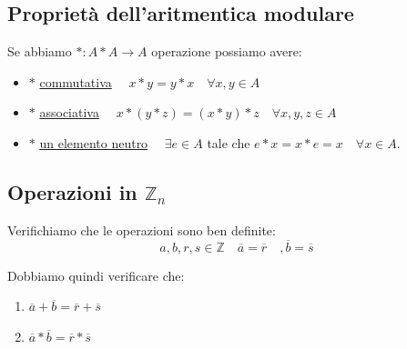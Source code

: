 \documentclass{article}
\begin{document}
\subsection{Proprietà dell'aritmentica modulare}
Se abbiamo $ * : A*A \to A $ operazione possiamo avere:
\begin{itemize}
        \item $ * $  \underline{commutativa} $ \quad x * y = y * x \quad \forall x,y \in A $
        \item $ * $  \underline{associativa} $ \quad x * (y * z) = (x * y) * z \quad \forall x,y,z \in A$
        \item $ * $ \underline{un elemento neutro} $ \quad \exists e \in A $ tale che $ e * x= x * e = x  \quad  \forall x \in A$. 
\end{itemize}




\subsection{Operazioni in $\mathbb{Z}_n$}



Verifichiamo che le operazioni sono ben definite:
\begin{equation*}
        a,b,r,s \in \mathbb{Z} \quad \overline{a} = \overline{r} \quad ,\overline{b} = \overline{s}
\end{equation*}

Dobbiamo quindi verificare che:
\begin{enumerate}
        \item $\overline{a} + \overline{b} = \overline{r} + \overline{s}$  
        \item $\overline{a} * \overline{b} = \overline{r} * \overline{s}$  
\end{enumerate}
\end{document}
